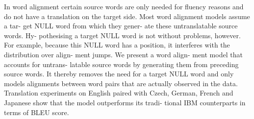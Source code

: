 In word alignment certain source words are only needed for fluency reasons and do not have a translation on the target side. Most word alignment models assume a tar- get NULL word from which they gener- ate these untranslatable source words. Hy- pothesising a target NULL word is not without problems, however. For example, because this NULL word has a position, it interferes with the distribution over align- ment jumps. We present a word align- ment model that accounts for untrans- latable source words by generating them from preceding source words. It thereby removes the need for a target NULL word and only models alignments between word pairs that are actually observed in the data. Translation experiments on English paired with Czech, German, French and Japanese show that the model outperforms its tradi- tional IBM counterparts in terms of BLEU score.
